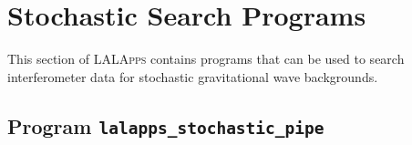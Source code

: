 

\clearpage

\section{Stochastic Search Programs}
\label{section:stochastic}

This section of \textsc{LALApps} contains programs that can be used to
search interferometer data for stochastic gravitational wave
backgrounds.

\clearpage


\clearpage
\subsection{Program \texttt{lalapps\_stochastic\_pipe}}
\label{program:stochastic-pipeline}

